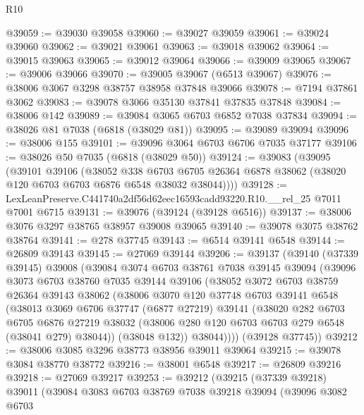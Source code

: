 \begin{lexlean}{R10}
\begin{coremodule}
@39059 := @39030 @39058
@39060 := @39027 @39059
@39061 := @39024 @39060
@39062 := @39021 @39061
@39063 := @39018 @39062
@39064 := @39015 @39063
@39065 := @39012 @39064
@39066 := @39009 @39065
@39067 := @39006 @39066
@39070 := @39005 @39067 (@6513 @39067)
@39076 := @38006 @3067 @3298 @38757 @38958 @37848 @39066
@39078 := @7194 @37861 @3062
@39083 := @39078 @3066 @35130 @37841 @37835 @37848
@39084 := @38006 @142
@39089 := @39084 @3065 @6703 @6852 @7038 @37834
@39094 := @38026 @81 @7038 (@6818 (@38029 @81))
@39095 := @39089 @39094
@39096 := @38006 @155
@39101 := @39096 @3064 @6703 @6706 @7035 @37177
@39106 := @38026 @50 @7035 (@6818 (@38029 @50))
@39124 := @39083
    (@39095
      (@39101
        @39106
        (@38052
          @338
          @6703
          @6705
          @26364
          @6878
          @38062
          (@38020 @120 @6703 @6703 @6876 @6548 @38032 @38044))))
@39128 := LexLeanPreserve.C441740a2df56d62eec16593cadd93220.R10.__rel_25 @7011 @7001 @6715
@39131 := @39076 (@39124 (@39128 @6516))
@39137 := @38006 @3076 @3297 @38765 @38957 @39008 @39065
@39140 := @39078 @3075 @38762 @38764
@39141 := @278 @37745
@39143 := @6514 @39141 @6548
@39144 := @26809 @39143
@39145 := @27069 @39144
@39206 := @39137
    (@39140
      (@37339 @39145)
      @39008
      (@39084
        @3074
        @6703
        @38761
        @7038
        @39145
        @39094
        (@39096
          @3073
          @6703
          @38760
          @7035
          @39144
          @39106
          (@38052
            @3072
            @6703
            @38759
            @26364
            @39143
            @38062
            (@38006
              @3070
              @120
              @37748
              @6703
              @39141
              @6548
              (@38013
                @3069
                @6706
                @37747
                (@6877 @27219)
                @39141
                (@38020
                  @282
                  @6703
                  @6705
                  @6876
                  @27219
                  @38032
                  (@38006 @280 @120 @6703 @6703 @279 @6548 (@38041 @279) @38044))
                (@38048 @132))
              @38044))))
      (@39128 @37745))
@39212 := @38006 @3085 @3296 @38773 @38956 @39011 @39064
@39215 := @39078 @3084 @38770 @38772
@39216 := @38001 @6548
@39217 := @26809 @39216
@39218 := @27069 @39217
@39253 := @39212
    (@39215
      (@37339 @39218)
      @39011
      (@39084
        @3083
        @6703
        @38769
        @7038
        @39218
        @39094
        (@39096
          @3082
          @6703

\end{coremodule}
\end{lexlean}
